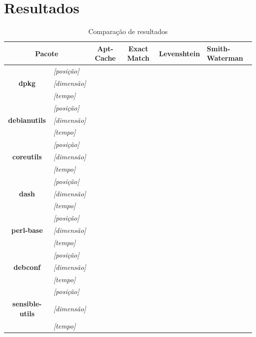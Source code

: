 \chapter{\nmu Resultados} %
\label{cha:resultados}

\begin{table}[htbp]
\caption{Comparação de resultados}
\begin{tabular}{|p{2cm}|l|c|c|c|p{2cm}|}
\hline
\multicolumn{ 2}{|c|}{\textbf{Pacote}} & \textbf{Apt-Cache} & \textbf{Exact Match} & \textbf{Levenshtein} & \textbf{Smith-Waterman} \\ \hline\hline
\multicolumn{ 1}{|c|}{} & \textit{[posição]} &  &  &  &  \\ \cline{ 2- 6}
\multicolumn{ 1}{|c|}{\textbf{dpkg}} & \textit{[dimensão]} &  &  &  &  \\ \cline{ 2- 6}
\multicolumn{ 1}{|c|}{} & \textit{[tempo]} &  &  &  &  \\ \hline
\multicolumn{ 1}{|c|}{} & \textit{[posição]} &  &  &  &  \\ \cline{ 2- 6}
\multicolumn{ 1}{|c|}{\textbf{debianutils}} & \textit{[dimensão]} &  &  &  &  \\ \cline{ 2- 6}
\multicolumn{ 1}{|c|}{} & \textit{[tempo]} &  &  &  &  \\ \hline
\multicolumn{ 1}{|c|}{} & \textit{[posição]} &  &  &  &  \\ \cline{ 2- 6}
\multicolumn{ 1}{|c|}{\textbf{coreutils}} & \textit{[dimensão]} &  &  &  &  \\ \cline{ 2- 6}
\multicolumn{ 1}{|c|}{} & \textit{[tempo]} &  &  &  &  \\ \hline
\multicolumn{ 1}{|c|}{} & \textit{[posição]} &  &  &  &  \\ \cline{ 2- 6}
\multicolumn{ 1}{|c|}{\textbf{dash}} & \textit{[dimensão]} &  &  &  &  \\ \cline{ 2- 6}
\multicolumn{ 1}{|c|}{} & \textit{[tempo]} &  &  &  &  \\ \hline
\multicolumn{ 1}{|c|}{} & \textit{[posição]} &  &  &  &  \\ \cline{ 2- 6}
\multicolumn{ 1}{|c|}{\textbf{perl-base}} & \textit{[dimensão]} &  &  &  &  \\ \cline{ 2- 6}
\multicolumn{ 1}{|c|}{} & \textit{[tempo]} &  &  &  &  \\ \hline
\multicolumn{ 1}{|c|}{} & \textit{[posição]} &  &  &  &  \\ \cline{ 2- 6}
\multicolumn{ 1}{|c|}{\textbf{debconf}} & \textit{[dimensão]} &  &  &  &  \\ \cline{ 2- 6}
\multicolumn{ 1}{|c|}{} & \textit{[tempo]} &  &  &  &  \\ \hline
\multicolumn{ 1}{|c|}{} & \textit{[posição]} &  &  &  &  \\ \cline{ 2- 6}
\multicolumn{ 1}{|c|}{\textbf{sensible-utils}} & \textit{[dimensão]} &  &  &  &  \\ \cline{ 2- 6}
\multicolumn{ 1}{|c|}{} & \textit{[tempo]} &  &  &  &  \\ \hline
\end{tabular}
\label{tab:comparacao}
\end{table}
